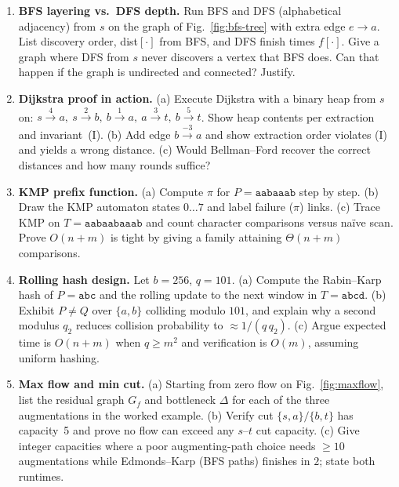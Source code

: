 \begin{enumerate}[label=E7.\arabic*, leftmargin=*, itemsep=0.8em]
    \item \textbf{BFS layering vs.\ DFS depth.} Run BFS and DFS (alphabetical adjacency) from $s$ on the graph of Fig.~\ref{fig:bfs-tree} with extra edge $e\to a$. List discovery order, dist$[\cdot]$ from BFS, and DFS finish times $f[\cdot]$. Give a graph where DFS from $s$ never discovers a vertex that BFS does. Can that happen if the graph is undirected and connected? Justify.

    \item \textbf{Dijkstra proof in action.} (a) Execute Dijkstra with a binary heap from $s$ on: $s\!\xrightarrow{4}\!a,\ s\!\xrightarrow{2}\!b,\ b\!\xrightarrow{1}\!a,\ a\!\xrightarrow{3}\!t,\ b\!\xrightarrow{5}\!t$. Show heap contents per extraction and invariant~(I). (b) Add edge $b\xrightarrow{-3}a$ and show extraction order violates (I) and yields a wrong distance. (c) Would Bellman--Ford recover the correct distances and how many rounds suffice?

    \item \textbf{KMP prefix function.} (a) Compute $\pi$ for $P=\mathtt{aabaaab}$ step by step. (b) Draw the KMP automaton states $0\ldots7$ and label failure ($\pi$) links. (c) Trace KMP on $T=\mathtt{aabaabaaab}$ and count character comparisons versus na\"ive scan. Prove $O(n+m)$ is tight by giving a family attaining $\Theta(n+m)$ comparisons.

    \item \textbf{Rolling hash design.} Let $b=256$, $q=101$. (a) Compute the Rabin--Karp hash of $P=\mathtt{abc}$ and the rolling update to the next window in $T=\mathtt{abcd}$. (b) Exhibit $P\neq Q$ over $\{a,b\}$ colliding modulo $101$, and explain why a second modulus $q_2$ reduces collision probability to $\approx 1/(q\,q_2)$. (c) Argue expected time is $O(n+m)$ when $q\ge m^2$ and verification is $O(m)$, assuming uniform hashing.

    \item \textbf{Max flow and min cut.} (a) Starting from zero flow on Fig.~\ref{fig:maxflow}, list the residual graph $G_f$ and bottleneck $\Delta$ for each of the three augmentations in the worked example. (b) Verify cut $\{s,a\}{/}\{b,t\}$ has capacity~5 and prove no flow can exceed any $s$--$t$ cut capacity. (c) Give integer capacities where a poor augmenting-path choice needs $\ge 10$ augmentations while Edmonds--Karp (BFS paths) finishes in $2$; state both runtimes.
\end{enumerate}
